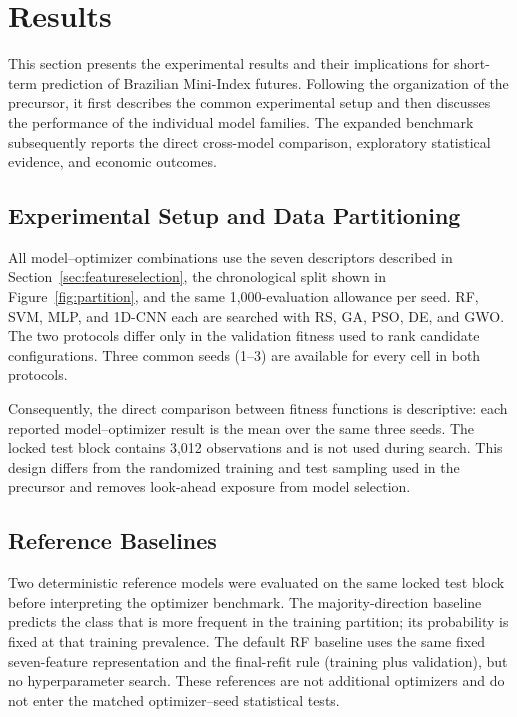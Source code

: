 \section{Results}\label{sec:results}

This section presents the experimental results and their implications for short-term prediction of Brazilian Mini-Index futures. Following the organization of the precursor, it first describes the common experimental setup and then discusses the performance of the individual model families. The expanded benchmark subsequently reports the direct cross-model comparison, exploratory statistical evidence, and economic outcomes.

\subsection{Experimental Setup and Data Partitioning}

All model--optimizer combinations use the seven descriptors described in Section~\ref{sec:featureselection}, the chronological split shown in Figure~\ref{fig:partition}, and the same 1,000-evaluation allowance per seed. RF, SVM, MLP, and 1D-CNN each are searched with RS, GA, PSO, DE, and GWO. The two protocols differ only in the validation fitness used to rank candidate configurations. Three common seeds (1--3) are available for every cell in both protocols.

Consequently, the direct comparison between fitness functions is descriptive: each reported model--optimizer result is the mean over the same three seeds. The locked test block contains 3,012 observations and is not used during search. This design differs from the randomized training and test sampling used in the precursor and removes look-ahead exposure from model selection.

\subsection{Reference Baselines}

Two deterministic reference models were evaluated on the same locked test block before interpreting the optimizer benchmark. The majority-direction baseline predicts the class that is more frequent in the training partition; its probability is fixed at that training prevalence. The default RF baseline uses the same fixed seven-feature representation and the final-refit rule (training plus validation), but no hyperparameter search. These references are not additional optimizers and do not enter the matched optimizer--seed statistical tests.

